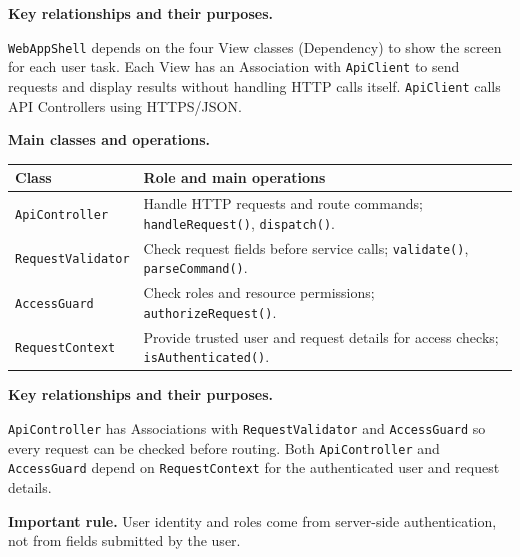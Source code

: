 \noindent\textbf{Key relationships and their purposes.}\par\smallskip
\texttt{WebAppShell} depends on the four View classes (Dependency) to
show the screen for each user task. Each View has an Association with
\texttt{ApiClient} to send requests and display results without handling
HTTP calls itself. \texttt{ApiClient} calls API Controllers using HTTPS/JSON.



\noindent\textbf{Main classes and operations.}\par\smallskip
\begingroup\small
\begin{tabularx}{\textwidth}{|L{0.37\textwidth}|Y|}
\hline
\textbf{Class} & \textbf{Role and main operations} \\ \hline
\texttt{ApiController} & Handle HTTP requests and route commands; \texttt{handleRequest()}, \texttt{dispatch()}. \\ \hline
\texttt{RequestValidator} & Check request fields before service calls; \texttt{validate()}, \texttt{parseCommand()}. \\ \hline
\texttt{AccessGuard} & Check roles and resource permissions; \texttt{authorizeRequest()}. \\ \hline
\texttt{RequestContext} & Provide trusted user and request details for access checks; \texttt{isAuthenticated()}. \\ \hline
\end{tabularx}
\endgroup

\noindent\textbf{Key relationships and their purposes.}\par\smallskip
\texttt{ApiController} has Associations with \texttt{RequestValidator}
and \texttt{AccessGuard} so every request can be checked before routing.
Both \texttt{ApiController} and \texttt{AccessGuard} depend on
\texttt{RequestContext} for the authenticated user and request details.

\noindent\textbf{Important rule.} User identity and roles come from server-side
authentication, not from fields submitted by the user.


